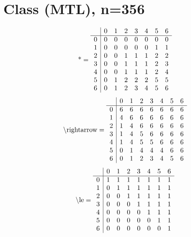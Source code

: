 \documentclass[11pt]{article}
\begin{document}
\section{Class (MTL), n=356}
\[\text{*} = 
\begin{array}{r | r r r r r r r}
 & 0 & 1 & 2 & 3 & 4 & 5 & 6 \\ \hline
0 & 0 & 0 & 0 & 0 & 0 & 0 & 0 \\
1 & 0 & 0 & 0 & 0 & 0 & 1 & 1 \\
2 & 0 & 0 & 1 & 1 & 1 & 2 & 2 \\
3 & 0 & 0 & 1 & 1 & 1 & 2 & 3 \\
4 & 0 & 0 & 1 & 1 & 1 & 2 & 4 \\
5 & 0 & 1 & 2 & 2 & 2 & 5 & 5 \\
6 & 0 & 1 & 2 & 3 & 4 & 5 & 6 \\
\end{array}
\]
\[\text{\textbackslash rightarrow} = 
\begin{array}{r | r r r r r r r}
 & 0 & 1 & 2 & 3 & 4 & 5 & 6 \\ \hline
0 & 6 & 6 & 6 & 6 & 6 & 6 & 6 \\
1 & 4 & 6 & 6 & 6 & 6 & 6 & 6 \\
2 & 1 & 4 & 6 & 6 & 6 & 6 & 6 \\
3 & 1 & 4 & 5 & 6 & 6 & 6 & 6 \\
4 & 1 & 4 & 5 & 5 & 6 & 6 & 6 \\
5 & 0 & 1 & 4 & 4 & 4 & 6 & 6 \\
6 & 0 & 1 & 2 & 3 & 4 & 5 & 6 \\
\end{array}
\]
\[\text{\textbackslash le} = 
\begin{array}{r | r r r r r r r}
 & 0 & 1 & 2 & 3 & 4 & 5 & 6 \\ \hline
0 & 1 & 1 & 1 & 1 & 1 & 1 & 1 \\
1 & 0 & 1 & 1 & 1 & 1 & 1 & 1 \\
2 & 0 & 0 & 1 & 1 & 1 & 1 & 1 \\
3 & 0 & 0 & 0 & 1 & 1 & 1 & 1 \\
4 & 0 & 0 & 0 & 0 & 1 & 1 & 1 \\
5 & 0 & 0 & 0 & 0 & 0 & 1 & 1 \\
6 & 0 & 0 & 0 & 0 & 0 & 0 & 1 \\
\end{array}
\]
\end{document}
